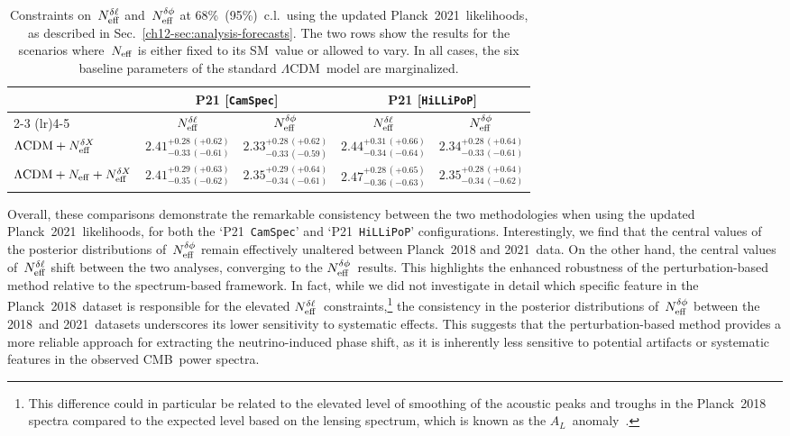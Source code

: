 \begin{table}
	\centering
	\small
	\setlength{\tabcolsep}{4pt}
	\begin{tabular}{l c c c c}
			\toprule
															& \multicolumn{2}{c}{P21 [\texttt{CamSpec}]}													& \multicolumn{2}{c}{P21 [\texttt{HiLLiPoP}]}													\\
															  \cmidrule(lr){2-3}																			  \cmidrule(lr){4-5}
															& {$N_\mathrm{eff}^{\delta\ell}$}								& {$N_\mathrm{eff}^{\delta\phi}$}									& {$N_\mathrm{eff}^{\delta\ell}$}								& {$N_\mathrm{eff}^{\delta\phi}$}									\\
			\midrule[0.065em]
		$\Lambda\mathrm{CDM} + N_\mathrm{eff}^{\delta X}$			& $2.41^{+0.28\, (+0.62)}_{-0.33\, (-0.61)}$	& $2.33^{+0.28\, (+0.62)}_{-0.33\, (-0.59)}$	& $2.44^{+0.31\, (+0.66)}_{-0.34\, (-0.64)}$	& $2.34^{+0.28\, (+0.64)}_{-0.33\, (-0.61)}$	\\[4pt]
		$\Lambda\mathrm{CDM} + N_\mathrm{eff} + N_\mathrm{eff}^{\delta X}$	& $2.41^{+0.29\, (+0.63)}_{-0.35\, (-0.62)}$	& $2.35^{+0.29\, (+0.64)}_{-0.34\, (-0.61)}$	& $2.47^{+0.28\, (+0.65)}_{-0.36\, (-0.63)}$	& $2.35^{+0.28\, (+0.64)}_{-0.34\, (-0.62)}$	\\[2pt]
			\bottomrule
	\end{tabular}
	\caption[Phase shift constraints from Planck 2021 likelihoods]{Constraints on~$N_\mathrm{eff}^{\delta\ell}$ and~$N_\mathrm{eff}^{\delta\phi}$ at 68\%~(95\%)~c.l.\ using the updated Planck~2021~likelihoods, as described in Sec.~\ref{ch12-sec:analysis-forecasts}. The two rows show the results for the scenarios where~$N_\mathrm{eff}$ is either fixed to its SM~value or allowed to vary. In all cases, the six baseline parameters of the standard $\Lambda$CDM~model are marginalized.}
	\label{ch12-tab:PR4_analysis}
\end{table}

Overall, these comparisons demonstrate the remarkable consistency between the two methodologies when using the updated Planck~2021~likelihoods, for both the `P21~\texttt{CamSpec}' and `P21~\texttt{HiLLiPoP}' configurations. Interestingly, we find that the central values of the posterior distributions of~$N_\mathrm{eff}^{\delta\phi}$ remain effectively unaltered between Planck~2018 and 2021~data. On the other hand, the central values of~$N_\mathrm{eff}^{\delta\ell}$ shift between the two analyses, converging to the $N_\mathrm{eff}^{\delta\phi}$~results. This highlights the enhanced robustness of the perturbation-based method relative to the spectrum-based framework. In fact, while we did not investigate in detail which specific feature in the Planck~2018~dataset is responsible for the elevated $N_\mathrm{eff}^{\delta\ell}$~constraints,\footnote{This difference could in particular be related to the elevated level of smoothing of the acoustic peaks and troughs in the Planck~2018 spectra compared to the expected level based on the lensing spectrum, which is known as the $A_L$~anomaly~\cite{Planck:2018vyg}.} the consistency in the posterior distributions of~$N_\mathrm{eff}^{\delta\phi}$ between the 2018~and 2021~datasets underscores its lower sensitivity to systematic effects. This suggests that the perturbation-based method provides a more reliable approach for extracting the neutrino-induced phase shift, as it is inherently less sensitive to potential artifacts or systematic features in the observed CMB~power spectra.

